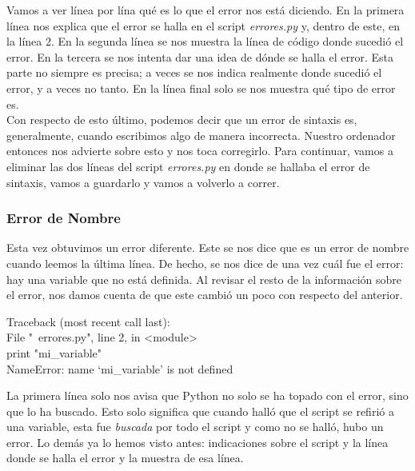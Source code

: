 \documentclass[10pt,letterpaper]{article}
\newenvironment{Code}
{
\begin{lrbox}{\selvestebox}%
\begin{minipage}{\dimexpr\columnwidth-2\fboxsep\relax}
\fontfamily{\ttdefault}\selectfont
}
{\end{minipage}\end{lrbox}%
\begin{center}
\colorbox{light-gray}{\usebox{\selvestebox}}
\end{center}
}
\begin{document}
Vamos a ver l\'inea por l\'ina qu\'e es lo que el error nos est\'a diciendo. En la primera l\'inea nos explica que el error se halla en el script \textit{errores.py} y, dentro de este, en la l\'inea 2. En la segunda l\'inea se nos muestra la l\'inea de c\'odigo donde sucedi\'o el error. En la tercera se nos intenta dar una idea de d\'onde se halla el error. Esta parte no siempre es precisa; a veces se nos indica realmente donde sucedi\'o el error, y a veces no tanto. En la l\'inea final solo se nos muestra qu\'e tipo de error es.\\

Con respecto de esto \'ultimo, podemos decir que un error de sintaxis es, generalmente, cuando escribimos algo de manera incorrecta. Nuestro ordenador entonces nos advierte sobre esto y nos toca corregirlo. Para continuar, vamos a eliminar las dos l\'ineas del script \textit{errores.py} en donde se hallaba el error de sintaxis, vamos a guardarlo y vamos a volverlo a correr.

\subsubsection{Error de Nombre}
Esta vez obtuvimos un error diferente. Este se nos dice que es un error de nombre cuando leemos la \'ultima l\'inea. De hecho, se nos dice de una vez cu\'al fue el error: hay una variable que no est\'a definida. Al revisar el resto de la informaci\'on sobre el error, nos damos cuenta de que este cambi\'o un poco con respecto del anterior.

\begin{Code}
{\color{red}Traceback (most recent call last):\\
\hspace*{4mm} File "\ \hspace{-2mm}errores.py", line 2, in <module>\\
\hspace*{8mm} print "mi\_variable"\\
NameError: name `mi\_variable' is not defined}
\end{Code}

La primera l\'inea solo nos avisa que Python no solo se ha topado con el error, sino que lo ha buscado. Esto solo significa que cuando hall\'o que el script se refiri\'o a una variable, esta fue \emph{buscada} por todo el script y como no se hall\'o, hubo un error. Lo dem\'as ya lo hemos visto antes: indicaciones sobre el script y la l\'inea donde se halla el error y la muestra de esa l\'inea.\\
\end{document}
